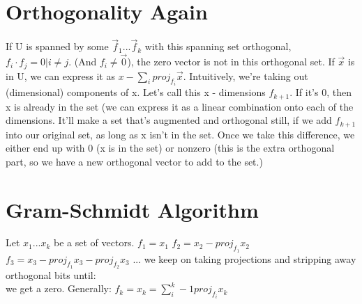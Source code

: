 \documentclass[10pt, twocolumn]{report}
\begin{document}
\section{Orthogonality Again}
If U is spanned by some $\vec f_1 ... \vec f_k$ with this spanning set orthogonal, $f_i \cdot f_j = 0 | i\neq j$. (And $f_i \neq \vec 0$), the zero vector is not in this orthogonal set. If $\vec x$ is in U, we can express it as $x - \sum_i proj_{f_i}\vec x. $ Intuitively, we're taking out (dimensional) components of x. Let's call this x - dimensions $f_{k+1}$. If it's 0, then x is already in the set (we can express it as a linear combination onto each of the dimensions. It'll make a set that's augmented and orthogonal still, if we add $f_{k+1}$ into our original set, as long as x isn't in the set. Once we take this difference, we either end up with 0 (x is in the set) or nonzero (this is the extra orthogonal part, so we have a new orthogonal vector to add to the set.)
\section {Gram-Schmidt Algorithm}
Let $x_1 ... x_k$ be a set of vectors.
$f_1 = x_1$
$f_2 = x_2 - proj_{f_1} x_2$
$f_3 = x_3 - proj_{f_1} x_3 - proj_{f_2} x_3$ ... we keep on taking projections and stripping away orthogonal bits until:\\ we get a zero. Generally:
$f_k = x_k = \sum_i^k-1 proj_{f_i}x_k$
\end{document}
